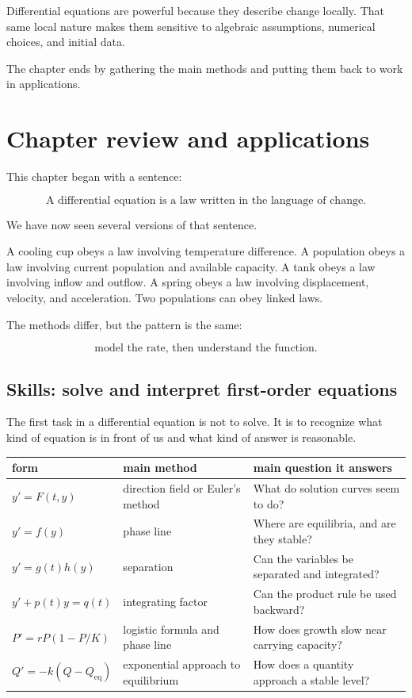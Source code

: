 Differential equations are powerful because they describe change locally.  That same
local nature makes them sensitive to algebraic assumptions, numerical choices, and
initial data.

The chapter ends by gathering the main methods and putting them back to work in
applications.

\section{Chapter review and applications}
\label{sec:de-chapter-review-applications}

This chapter began with a sentence:

\[
\text{A differential equation is a law written in the language of change.}
\]

We have now seen several versions of that sentence.

A cooling cup obeys a law involving temperature difference.  A population obeys a law
involving current population and available capacity.  A tank obeys a law involving inflow
and outflow.  A spring obeys a law involving displacement, velocity, and acceleration.
Two populations can obey linked laws.

The methods differ, but the pattern is the same:

\[
\boxed{
\text{model the rate, then understand the function.}
}
\]

\subsection{Skills: solve and interpret first-order equations}
\label{subsec:skills-solve-interpret-first-order-equations}

The first task in a differential equation is not to solve.  It is to recognize what kind of
equation is in front of us and what kind of answer is reasonable.

\begin{center}
\begin{tabular}{p{}|p{}|p{}}
\textbf{form} & \textbf{main method} & \textbf{main question it answers} \\ \hline
\(y'=F(t,y)\) & direction field or Euler's method & What do solution curves seem to do? \\[4pt]
\(y'=f(y)\) & phase line & Where are equilibria, and are they stable? \\[4pt]
\(y'=g(t)h(y)\) & separation & Can the variables be separated and integrated? \\[4pt]
\(y'+p(t)y=q(t)\) & integrating factor & Can the product rule be used backward? \\[4pt]
\(P'=rP(1-P/K)\) & logistic formula and phase line & How does growth slow near carrying capacity? \\[4pt]
\(Q'=-k(Q-Q_{\text{eq}})\) & exponential approach to equilibrium & How does a quantity approach a stable level?
\end{tabular}
\end{center}

